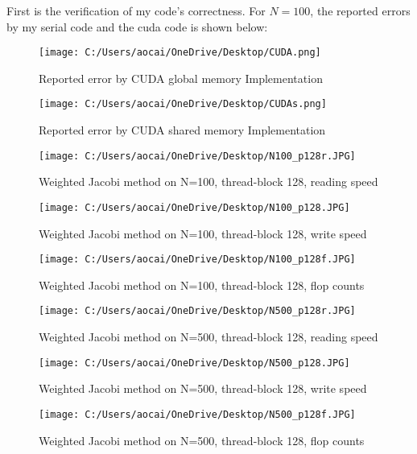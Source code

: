 \documentclass[12pt]{article}
\begin{document}
First is the verification of my code's correctness. For $N=100$, the reported errors by my serial code and the cuda code is shown below:

\begin{figure}[H]
	\centering
	\texttt{[image: C:/Users/aocai/OneDrive/Desktop/CUDA.png]}
	\caption[Optional caption]{Reported error by CUDA global memory Implementation}
	\label{fig:CUDA}
\end{figure}
\begin{figure}[H]
	\centering
	\texttt{[image: C:/Users/aocai/OneDrive/Desktop/CUDAs.png]}
	\caption[Optional caption]{Reported error by CUDA shared memory Implementation}
	\label{fig:CUDAs}
\end{figure}
\begin{figure}[H]
	\centering
	\texttt{[image: C:/Users/aocai/OneDrive/Desktop/N100\_p128r.JPG]}
	\caption[Optional caption]{Weighted Jacobi method on N=100, thread-block 128, reading speed}
	\label{fig:N100_p128r}
\end{figure}
\begin{figure}[H]
	\centering
	\texttt{[image: C:/Users/aocai/OneDrive/Desktop/N100\_p128.JPG]}
	\caption[Optional caption]{Weighted Jacobi method on N=100, thread-block 128, write speed}
	\label{fig:N100_p128w}
\end{figure}
\begin{figure}[H]
	\centering
	\texttt{[image: C:/Users/aocai/OneDrive/Desktop/N100\_p128f.JPG]}
	\caption[Optional caption]{Weighted Jacobi method on N=100, thread-block 128, flop counts}
	\label{fig:N100_p128f}
\end{figure}
\begin{figure}[H]
	\centering
	\texttt{[image: C:/Users/aocai/OneDrive/Desktop/N500\_p128r.JPG]}
	\caption[Optional caption]{Weighted Jacobi method on N=500, thread-block 128, reading speed}
	\label{fig:N500_p128r}
\end{figure}
\begin{figure}[H]
	\centering
	\texttt{[image: C:/Users/aocai/OneDrive/Desktop/N500\_p128.JPG]}
	\caption[Optional caption]{Weighted Jacobi method on N=500, thread-block 128, write speed}
	\label{fig:N500_p128w}
\end{figure}
\begin{figure}[H]
	\centering
	\texttt{[image: C:/Users/aocai/OneDrive/Desktop/N500\_p128f.JPG]}
	\caption[Optional caption]{Weighted Jacobi method on N=500, thread-block 128, flop counts}
	\label{fig:N500_p128f}
\end{figure}
\end{document}

